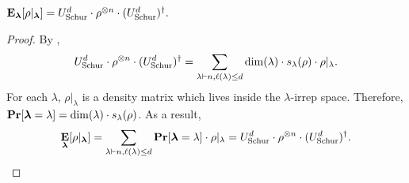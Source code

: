 


\begin{lemma}
    \label{lem:blambda-average}
    $
        \mathop{\bf E\/}_{\boldsymbol{\lambda}}[\rho|_{\boldsymbol{\lambda}}]= U_{\mathrm{Schur}}^d \cdot \rho^{\otimes n} \cdot (U_{\mathrm{Schur}}^d)^{\dagger}.
    $
\end{lemma}
\begin{proof}
    By ,
    \begin{equation*}
    U_{\mathrm{Schur}}^d \cdot \rho^{\otimes n} \cdot (U_{\mathrm{Schur}}^d)^{\dagger}
    = \sum_{\lambda \vdash n, \ell(\lambda) \leq d} \dim(\lambda) \cdot s_{\lambda}(\rho) \cdot \rho|_{\lambda}.
    \end{equation*}
    For each $\lambda$, $\rho|_{\lambda}$ is a density matrix which lives inside the $\lambda$-irrep space.
    Therefore, $\mathop{\bf Pr\/}[\boldsymbol{\lambda} = \lambda] = \dim(\lambda) \cdot s_{\lambda}(\rho)$.
    As a result,
    \begin{equation*}
        \mathop{\bf E\/}_{\boldsymbol{\lambda}}[\rho|_{\boldsymbol{\lambda}}]
        = \sum_{\lambda \vdash n, \ell(\lambda) \leq d} \mathop{\bf Pr\/}[\boldsymbol{\lambda} = \lambda] \cdot \rho|_{\lambda}
        = U_{\mathrm{Schur}}^d \cdot \rho^{\otimes n} \cdot (U_{\mathrm{Schur}}^d)^{\dagger}.\qedhere
    \end{equation*}
\end{proof}
